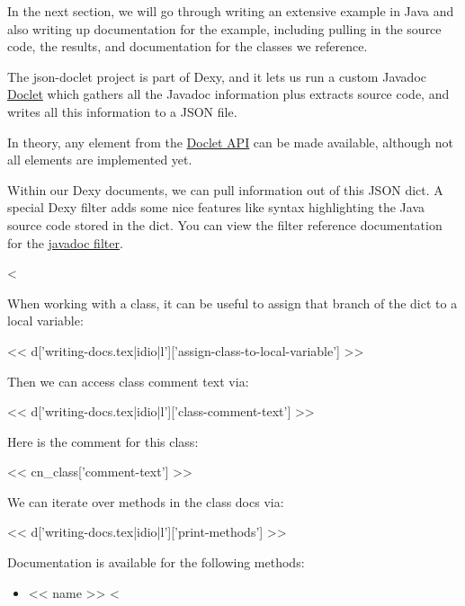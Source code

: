 In the next section, we will go through writing an extensive example in Java
and also writing up documentation for the example, including pulling in the
source code, the results, and documentation for the classes we reference.

The json-doclet project is part of Dexy, and it lets us run a custom Javadoc
\href{http://download.oracle.com/javase/6/docs/technotes/guides/javadoc/doclet/overview.html}{Doclet}
which gathers all the Javadoc information plus extracts source code, and
writes all this information to a JSON file.

In theory, any element from the \href{http://download.oracle.com/javase/6/docs/jdk/api/javadoc/doclet/index.html}{Doclet API}
can be made available, although not all elements are implemented yet.

Within our Dexy documents, we can pull information out of this JSON dict. A
special Dexy filter adds some nice features like syntax highlighting the Java
source code stored in the dict. You can view the filter reference documentation
for the \href{http://dexy.it/docs/filters/javadoc}{javadoc filter}.

<%

When working with a class, it can be useful to assign that branch of the dict to a local variable:

<< d['writing-docs.tex|idio|l']['assign-class-to-local-variable'] >>

Then we can access class comment text via:

<< d['writing-docs.tex|idio|l']['class-comment-text'] >>

Here is the comment for this class:

<< cn_class['comment-text'] >>

We can iterate over methods in the class docs via:

<< d['writing-docs.tex|idio|l']['print-methods'] >>

Documentation is available for the following methods:

\begin{itemize}
<%
\item{<< name >>}
<%
\end{itemize}

